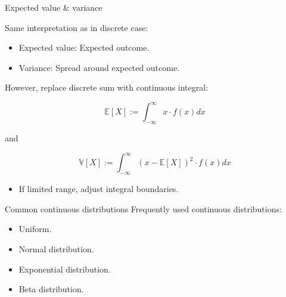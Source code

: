 \documentclass{beamer}
\newcommand{\E}{\mathbb{E}}
\newcommand{\V}{\mathbb{V}}
\newcommand{\1}{\ensuremath{\mathbf{1}}}
\begin{document}
%
%
%
\begin{frame}{Expected value \& variance}
    \begin{block}{}
        Same interpretation as in discrete case:
    \end{block}
    \begin{itemize}
        \item Expected value: Expected outcome.
        \item Variance: Spread around expected outcome.
    \end{itemize}
    However, replace discrete sum with continuous integral:
    \begin{block}{}
        \begin{equation}
            \E[X] := \int_{-\infty}^\infty x \cdot f(x) dx
        \end{equation}
    \end{block}
    and
    \begin{block}{}
        \begin{equation}
            \V[X] := \int_{-\infty}^\infty (x - \E[X])^2 \cdot f(x) dx
        \end{equation}
    \end{block}
    \begin{itemize}
        \item If limited range, adjust integral boundaries.
    \end{itemize}
\end{frame}
%
%
%
\begin{frame}{Common continuous distributions}
    Frequently used continuous distributions:
    \begin{itemize}
        \item Uniform.
        \item Normal distribution.
        \item Exponential distribution.
        \item Beta distribution.
    \end{itemize}
\end{frame}
%
%
%
\end{document}
